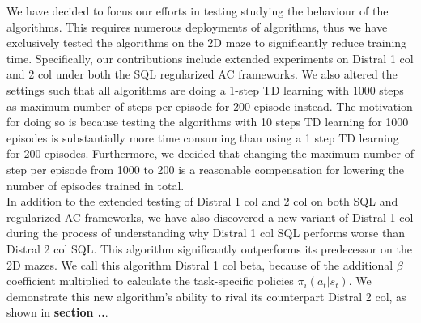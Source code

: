 \documentclass[12pt]{report}
\begin{document}
We have decided to focus our efforts in testing studying the behaviour of the algorithms. This requires numerous deployments of algorithms, thus we have exclusively tested the algorithms on the 2D maze to significantly reduce training time. Specifically, our contributions include extended experiments on Distral 1 col and 2 col under both the SQL regularized AC frameworks. We also altered the settings such that all algorithms are doing a 1-step TD learning with 1000 steps as maximum number of steps per episode for 200 episode instead. The motivation for doing so is because testing the algorithms with 10 steps TD learning for 1000 episodes is substantially more time consuming than using a 1 step TD learning for 200 episodes. Furthermore, we decided that changing the maximum number of step per episode from 1000 to 200 is a reasonable compensation for lowering the number of episodes trained in total.\\

In addition to the extended testing of Distral 1 col and 2 col on both SQL and regularized AC frameworks, we have also discovered a new variant of Distral 1 col during the process of understanding why Distral 1 col SQL performs worse than Distral 2 col SQL. This algorithm significantly outperforms its predecessor on the 2D mazes. We call this algorithm Distral 1 col beta, because of the additional $\beta$ coefficient multiplied to calculate the task-specific policies $\pi_i(a_t|s_t)$. We demonstrate this new algorithm's ability to rival its counterpart Distral 2 col, as shown in \textbf{section ..}.


\end{document}
